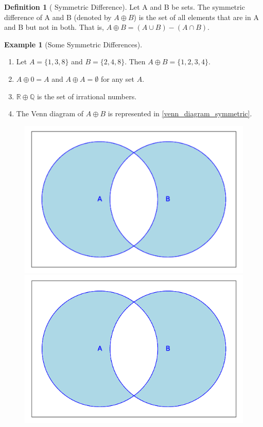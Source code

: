 \documentclass[10pt,]{book}
\theoremstyle{plain}
\theoremstyle{definition}
\newtheorem{definition}[theorem]{Definition}
\theoremstyle{definition}
\theoremstyle{definition}
\newtheorem{example}[theorem]{Example}
\theoremstyle{definition}
\begin{document}
\begin{definition}[ Symmetric Difference]\label{symmetric-difference.}
\label{notation-10}
Let A and B be sets. The symmetric difference of A and B (denoted by \(A\oplus B\)) is the set of all elements
that are in A and B but not in both. That is, \(A \oplus  B = (A \cup  B) - (A \cap  B)\). %
\end{definition}
\begin{example}[Some Symmetric Differences]\label{some_symmetric_differences}
\leavevmode%
\begin{enumerate}[label=\alph*]
\item\hypertarget{li-72}{}Let \(A = \{1, 3, 8\}\) and \(B = \{2, 4, 8\}\). Then \(A \oplus  B = \{1, 2, 3, 4\}\). 
%
\item\hypertarget{li-73}{}\(A \oplus  0 = A\) and \(A \oplus  A = \emptyset\) for any set \(A\). 
%
\item\hypertarget{li-74}{}\(\mathbb{R} \oplus  \mathbb{Q}\) is the set of irrational numbers. 
%
\item\hypertarget{li-75}{}The Venn diagram of \(A \oplus  B\) is represented in \hyperref[venn_diagram_symmetric]{\ref{venn_diagram_symmetric}}.%
\end{enumerate}
%
\leavevmode%
\begin{figure}
\centering
{}%
{\includegraphics[width=1\linewidth]{images/sageplot-venn-symmetric.pdf}}%
{\includegraphics[width=1\linewidth]{images/sageplot-venn-symmetric.png}}

\end{figure}
\end{example}
\end{document}
